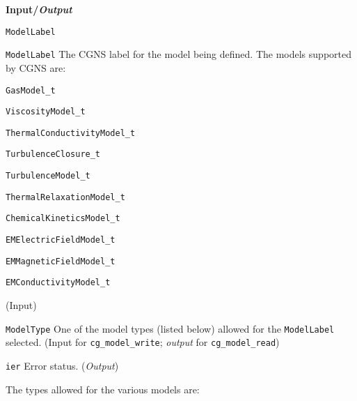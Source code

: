 \noindent
\textbf{\textcolor{input}{Input}/\textcolor{output}{\textit{Output}}}

\begin{Ventryi}{\texttt{ModelLabel}}\raggedright
\item [\texttt{ModelLabel}]
      The CGNS label for the model being defined.
      The models supported by CGNS are:
      \begin{itemize*}
      \item \texttt{GasModel\_t}
      \item \texttt{ViscosityModel\_t}
      \item \texttt{ThermalConductivityModel\_t}
      \item \texttt{TurbulenceClosure\_t}
      \item \texttt{TurbulenceModel\_t}
      \item \texttt{ThermalRelaxationModel\_t}
      \item \texttt{ChemicalKineticsModel\_t}
      \item \texttt{EMElectricFieldModel\_t}
      \item \texttt{EMMagneticFieldModel\_t}
      \item \texttt{EMConductivityModel\_t}
      \end{itemize*}
      (\textcolor{input}{Input})
\item [\texttt{ModelType}]
      One of the model types (listed below) allowed for the
      \texttt{ModelLabel} selected.
      (\textcolor{input}{Input} for \texttt{cg\_model\_write};
      \textcolor{output}{\textit{output}} for \texttt{cg\_model\_read})
\item [\texttt{ier}]
      Error status.
      (\textcolor{output}{\textit{Output}})
\end{Ventryi}

\noindent
The types allowed for the various models are:

